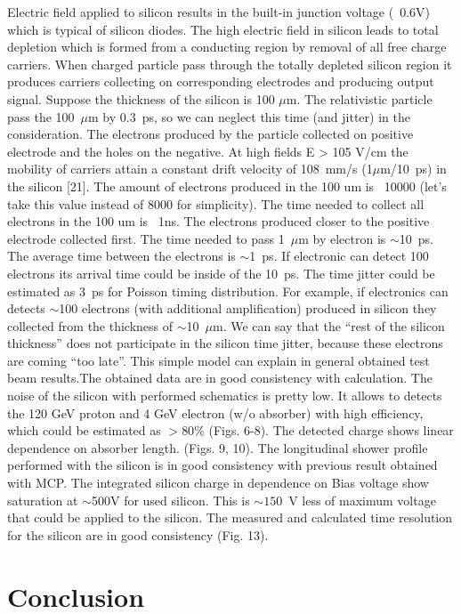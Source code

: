 \documentclass[12pt]{article}
\begin{document}
{Electric field applied to silicon results in the built-in junction voltage
(~0.6V) which is typical of silicon diodes. The high electric field in silicon
leads to total depletion which is formed from a conducting region by removal of
all free charge carriers. When charged particle pass through the totally
depleted silicon region it produces carriers collecting on corresponding
electrodes and producing output signal. Suppose the thickness of the silicon is
100 $\mu$m. The relativistic particle pass the 100~$\mu$m by 0.3~ps, so we can neglect
this time (and jitter) in the consideration. The electrons produced by the
particle collected on positive electrode and the holes on the negative. At high
fields E > 105 V/cm the mobility of carriers attain a constant drift velocity of
108~mm/s (1$\mu$m/10~ps) in the silicon [21]. The amount of electrons produced in the
100 um is ~10000 (let’s take this value instead of 8000 for simplicity). The
time needed to collect all electrons in the 100 um is ~1ns. The electrons produced closer to the positive electrode collected first. The
time needed to pass 1~$\mu$m by electron is $\sim$10~ps. The average time between the
electrons is $\sim$1~ps. If electronic can detect 100 electrons its arrival time
could be inside of the 10~ps. The time jitter could be estimated as 3~ps for
Poisson timing distribution. For example, if electronics can detects $\sim$100
electrons (with additional amplification) produced in silicon they collected
from the thickness of $\sim$10~$\mu$m. We can say that the ``rest of the silicon
thickness'' does not participate in the silicon time jitter, because these
electrons are coming ``too late''. This simple model can explain in general
obtained test beam results.The obtained data are in good consistency with calculation. The noise of the
silicon with performed schematics is pretty low. It allows to detects the 120
GeV proton and 4 GeV electron (w/o absorber) with high efficiency, which could
be estimated as $>80$\% (Figs. 6-8). The detected charge shows linear dependence
on absorber length. (Figs. 9, 10). The longitudinal shower profile performed
with the silicon is in good consistency with previous result obtained with MCP.
The integrated silicon charge in dependence on Bias voltage show saturation at
$\sim$500V for used silicon. This is $\sim 150$~V less of maximum voltage that could be
applied to the silicon. The measured and calculated time resolution for the
silicon are in good consistency (Fig. 13).


\section{Conclusion}
\label{sec:conclusion} 

}
\end{document}

